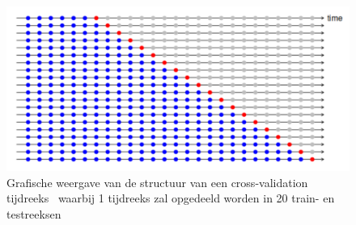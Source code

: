 \begin{figure}
    \centering
    \caption{Grafische weergave van de structuur van een cross-validation tijdreeks~\autocite{Hyndman2018} waarbij 1 tijdreeks zal opgedeeld worden in 20 train- en testreeksen}
    \label{fig:cross_validation_ts}
    \includegraphics[width=0.9\linewidth]{cross_validation_ts}
\end{figure}


